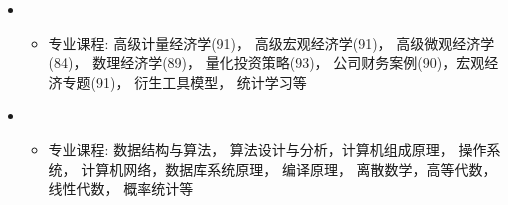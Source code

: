   \begin{itemize}[leftmargin=*]
    \item
      {\small
      \begin{itemize}
        \item{专业课程:  高级计量经济学(91)， 高级宏观经济学(91)， 高级微观经济学(84)， 数理经济学(89)， 量化投资策略(93)， 公司财务案例(90)，宏观经济专题(91)， 衍生工具模型， 统计学习等}
      \end{itemize}
      }
    \item
      {\small
      \begin{itemize}
        \item{专业课程: 数据结构与算法， 算法设计与分析，计算机组成原理， 操作系统， 计算机网络，数据库系统原理， 编译原理， 离散数学，高等代数， 线性代数， 概率统计等}
      \end{itemize}
      }
  \end{itemize}